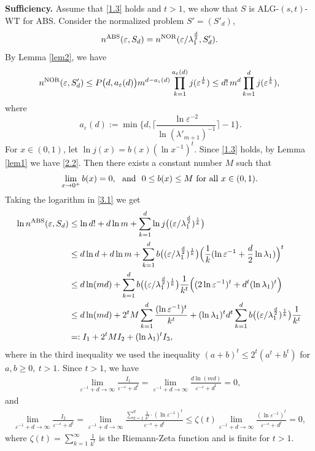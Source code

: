 \documentclass{amsart}
\numberwithin{equation}{section}
\def\vz{\varepsilon}
\def\lz{\lambda}
\begin{document}
{\bf Sufficiency.} Assume that \eqref{1.3} holds and $t>1$, we
show that $S$ is ALG-$(s,t)$-WT for ABS. Consider the normalized
problem $S'=(S'_d)$,
$$n^{\rm ABS}(\vz,S_d)=n^{\rm NOR}(\vz/\lambda_1^\frac{d}{2},S'_d).$$
 By Lemma \ref{lem2}, we have
\begin{align}
n^{\rm NOR}(\vz,S'_d)\le
P\big(d,{a_{\vz}(d)}\big)m^{d-a_{\vz}(d)}\prod_{k=1}^{a_{\vz}(d)}j(\vz^{\frac{1}{k}})\le
d!\, m^d \prod_{k=1}^{d}j(\vz^{\frac{1}{k}}),\label{3.1}
\end{align}
where
\begin{equation*}\
a_{\vz}(d):=\min\big\{d,\big\lceil\frac{\ln\vz^{-2}}{\ln(\lambda'_{m+1})^{-1}}\big\rceil-1\big\}.
\end{equation*}
For $x\in(0,1)$, let $\ln j(x)=b(x) (\ln x^{-1})^t$. Since
\eqref{1.3} holds,  by Lemma \ref{lem1} we have \eqref{2.2}. Then
there exists a constant number $M$ such that
$$\lim\limits_{x\to 0^+}b(x)= 0, \ \ {\rm and}\ \  0\le b(x)\le M \ {\rm for\ all }\ x\in(0, 1).$$
Taking the logarithm in \eqref{3.1} we get
\begin{align}\label{3.2}
{\ln n^{\rm ABS}(\vz,S_d)}&\le {\ln d!+d\ln m+\sum_{k=1}^{d}\ln
j\big((\vz/\lz_1^{\frac{d}{2}})^{\frac{1}{k}}\big)}\notag \\ &\le
d\ln d +d\ln m+
\sum_{k=1}^{d}b\big((\vz/\lz_1^{\frac{d}{2}})^{\frac{1}{k}}\big)\Big(\frac{1}{k}(\ln\vz^{-1}+\frac{d}{2}\ln
\lz_1)\Big)^t
\notag \\
&\le d\ln (md)
+\sum_{k=1}^{d}b\big((\vz/\lz_1^{\frac{d}{2}})^{\frac{1}{k}}\big)\frac{1}{k^t}\Big((2\ln
\vz^{-1})^t+d^t(\ln \lz_1)^t\Big)\notag\\ &\le d\ln (md)
+2^tM\sum_{k=1}^{d}\frac{(\ln \vz^{-1})^t}{k^t} +(\ln
\lz_1)^td^t\sum_{k=1}^{d}b\big((\vz/\lz_1^{\frac{d}{2}})^{\frac{1}{k}}\big)\frac{1}{k^t}\notag\\
&=: I_1+2^tM I_2+(\ln \lz_1)^t I_3,
\end{align}
where in the third inequality we used the inequality $(a+b)^t\le
2^t(a^t+b^t)$ for $a,b\ge 0,\ t>1$. Since $t>1$, we have
\begin{align*}
\lim_{\varepsilon^{-1}+d \rightarrow \infty} \frac{I_1}{
\varepsilon^{-s}+d^t }=\lim_{\varepsilon^{-1}+d \rightarrow \infty}
\frac{d\ln (md)}{\varepsilon^{-s}+d^t } = 0,
\end{align*}
and
\begin{align*}
\lim_{\varepsilon^{-1}+d \rightarrow \infty} \frac{I_2}{
\varepsilon^{-s}+d^t }=\lim_{\varepsilon^{-1}+d \rightarrow \infty}
\frac{\sum\limits_{k=1}^{d}\frac{1}{k^t}\cdot (\ln \vz^{-1})^t}{
\varepsilon^{-s}+d^t }\le \zeta(t) \lim_{\varepsilon^{-1}+d \rightarrow
\infty} \frac{(\ln \vz^{-1})^t}{ \varepsilon^{-s}+d^t } = 0,
\end{align*}
where $\zeta(t)=\sum_{k=1}^\infty\frac1{k^t}$ is  the Riemann-Zeta
function and is finite for $t>1$.
\end{document}
